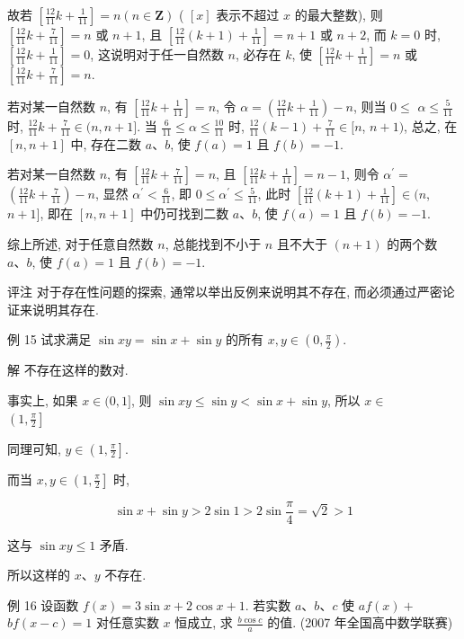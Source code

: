 	故若 $\left[\frac{12}{11} k+\frac{1}{11}\right]=n(n \in \mathbf{Z})$ ( $[x]$ 表示不超过 $x$ 的最大整数), 则 $\left[\frac{12}{11} k+\frac{7}{11}\right]=n$ 或 $n+1$, 且 $\left[\frac{12}{11}(k+1)+\frac{1}{11}\right]=n+1$ 或 $n+2$, 而 $k=0$ 时, $\left[\frac{12}{11} k+\frac{1}{11}\right]=0$, 这说明对于任一自然数 $n$, 必存在 $k$, 使 $\left[\frac{12}{11} k+\frac{1}{11}\right]=n$ 或 $\left[\frac{12}{11} k+\frac{7}{11}\right]=n$.

	若对某一自然数 $n$, 有 $\left[\frac{12}{11} k+\frac{1}{11}\right]=n$, 令 $\alpha=\left(\frac{12}{11} k+\frac{1}{11}\right)-n$, 则当 $0 \leqslant$ $\alpha \leqslant \frac{5}{11}$ 时, $\frac{12}{11} k+\frac{7}{11} \in(n, n+1]$. 当 $\frac{6}{11} \leqslant \alpha \leqslant \frac{10}{11}$ 时, $\frac{12}{11}(k-1)+\frac{7}{11} \in[n$, $n+1)$, 总之, 在 $[n, n+1]$ 中, 存在二数 $a 、 b$, 使 $f(a)=1$ 且 $f(b)=-1$.

	若对某一自然数 $n$, 有 $\left[\frac{12}{11} k+\frac{7}{11}\right]=n$, 且 $\left[\frac{12}{11} k+\frac{1}{11}\right]=n-1$, 则令 $\alpha^{\prime}=$ $\left(\frac{12}{11} k+\frac{7}{11}\right)-n$, 显然 $\alpha^{\prime}<\frac{6}{11}$, 即 $0 \leqslant \alpha^{\prime} \leqslant \frac{5}{11}$, 此时 $\left[\frac{12}{11}(k+1)+\frac{1}{11}\right] \in(n$, $n+1]$, 即在 $[n, n+1]$ 中仍可找到二数 $a 、 b$, 使 $f(a)=1$ 且 $f(b)=-1$.

	综上所述, 对于任意自然数 $n$, 总能找到不小于 $n$ 且不大于 $(n+1)$ 的两个数 $a 、 b$, 使 $f(a)=1$ 且 $f(b)=-1$.

	评注 对于存在性问题的探索, 通常以举出反例来说明其不存在, 而必须通过严密论证来说明其存在.

	例 15 试求满足 $\sin x y=\sin x+\sin y$ 的所有 $x, y \in\left(0, \frac{\pi}{2}\right)$.

	解 不存在这样的数对.

	事实上, 如果 $x \in(0,1]$, 则 $\sin x y \leqslant \sin y<\sin x+\sin y$, 所以 $x \in$\\
$\left(1, \frac{\pi}{2}\right]$

	同理可知, $y \in\left(1, \frac{\pi}{2}\right]$.

	而当 $x, y \in\left(1, \frac{\pi}{2}\right]$ 时,

	$$
		\sin x+\sin y>2 \sin 1>2 \sin \frac{\pi}{4}=\sqrt{2}>1
	$$

	这与 $\sin x y \leqslant 1$ 矛盾.

	所以这样的 $x 、 y$ 不存在.

	例 16 设函数 $f(x)=3 \sin x+2 \cos x+1$. 若实数 $a 、 b 、 c$ 使 $a f(x)+$ $b f(x-c)=1$ 对任意实数 $x$ 恒成立, 求 $\frac{b \cos c}{a}$ 的值. (2007 年全国高中数学联赛)

